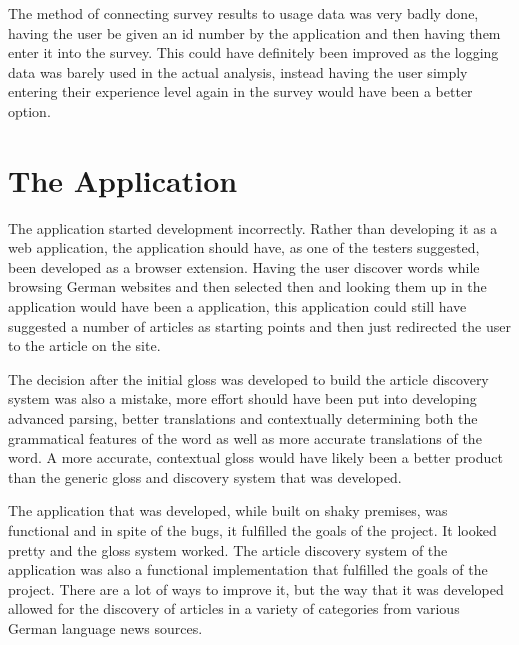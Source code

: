 The method of connecting survey results to usage data was very badly done, having the user be given an id number by the application and then having them enter it into the survey. This could have definitely been improved as the logging data was barely used in the actual analysis, instead having the user simply entering their experience level again in the survey would have been a better option. 

\section{The Application}

The application started development incorrectly. Rather than developing it as a web application, the application should have, as one of the testers suggested, been developed as a browser extension. Having the user discover words while browsing German websites and then selected then and looking them up in the application would have been a application, this application could still have suggested a number of articles as starting points and then just redirected the user to the article on the site. 

The decision after the initial gloss was developed to build the article discovery system was also a mistake, more effort should have been put into developing advanced parsing, better translations and contextually determining both the grammatical features of the word as well as more accurate translations of the word. A more accurate, contextual gloss would have likely been a better product than the generic gloss and discovery system that was developed.

The application that was developed, while built on shaky premises, was functional and in spite of the bugs, it fulfilled the goals of the project. It looked pretty and the gloss system worked. The article discovery system of the application was also a functional implementation that fulfilled the goals of the project. There are a lot of ways to improve it, but the way that it was developed allowed for the discovery of articles in a variety of categories from various German language news sources.

